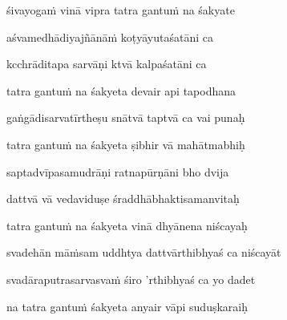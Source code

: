 śivayogaṁ vinā vipra tatra gantuṁ na śakyate \veg\dontdisplaylinenum
{}

aśvamedhādiyajñānāṁ koṭyāyutaśatāni ca\thinspace{\dandab} \dontdisplaylinenum

kcchrāditapa sarvāṇi ktvā kalpaśatāni ca \danda\dontdisplaylinenum
{}

tatra gantuṁ na śakyeta devair api tapodhana \veg\dontdisplaylinenum
{}

gaṅgādisarvatīrtheṣu snātvā taptvā ca vai punaḥ\thinspace{\dandab} \dontdisplaylinenum

tatra gantuṁ na śakyeta ṣibhir vā mahātmabhiḥ \veg\dontdisplaylinenum
{}

saptadvīpasamudrāṇi ratnapūrṇāni bho dvija\thinspace{\dandab} \dontdisplaylinenum

dattvā vā vedaviduṣe śraddhābhaktisamanvitaḥ \danda\dontdisplaylinenum

tatra gantuṁ na śakyeta vinā dhyānena niścayaḥ \veg\dontdisplaylinenum
{}

svadehān māṁsam uddhtya dattvārthibhyaś ca niścayāt\thinspace{\dandab} \dontdisplaylinenum
{}

svadāraputrasarvasvaṁ śiro 'rthibhyaś ca yo dadet \danda\dontdisplaylinenum
{}

na tatra gantuṁ śakyeta anyair vāpi suduṣkaraiḥ \veg\dontdisplaylinenum
{}

